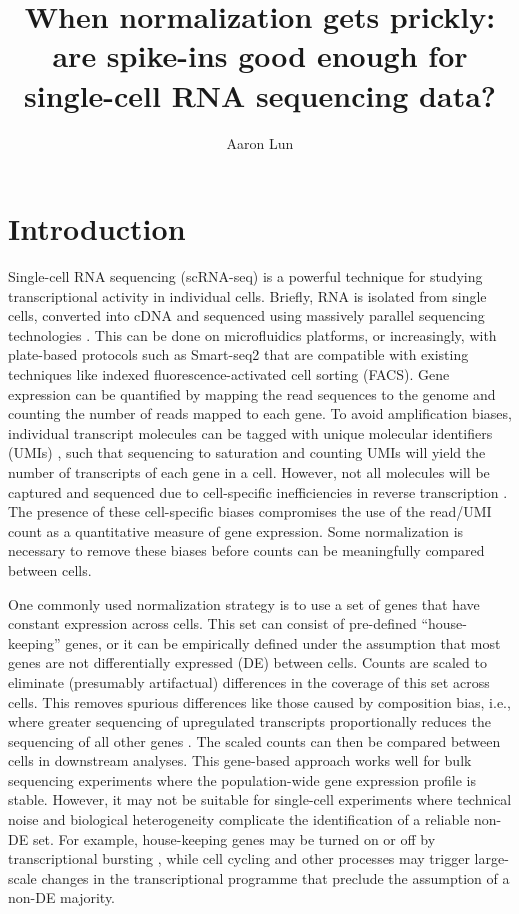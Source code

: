 \documentclass{article}
\title{When normalization gets prickly: are spike-ins good enough for single-cell RNA sequencing data?}
\author{Aaron Lun}
\begin{document}
\maketitle

\section{Introduction}
Single-cell RNA sequencing (scRNA-seq) is a powerful technique for studying transcriptional activity in individual cells.
Briefly, RNA is isolated from single cells, converted into cDNA and sequenced using massively parallel sequencing technologies \cite{shapiro2013singlecell}.
This can be done on microfluidics platforms, or increasingly, with plate-based protocols such as Smart-seq2 \cite{picelli2014full} that are compatible with existing techniques like indexed fluorescence-activated cell sorting (FACS).
Gene expression can be quantified by mapping the read sequences to the genome and counting the number of reads mapped to each gene.
To avoid amplification biases, individual transcript molecules can be tagged with unique molecular identifiers (UMIs) \cite{islam2014quantitative}, such that sequencing to saturation and counting UMIs will yield the number of transcripts of each gene in a cell.
However, not all molecules will be captured and sequenced due to cell-specific inefficiencies in reverse transcription \cite{stegle2015computational}.
The presence of these cell-specific biases compromises the use of the read/UMI count as a quantitative measure of gene expression.
Some normalization is necessary to remove these biases before counts can be meaningfully compared between cells.

One commonly used normalization strategy is to use a set of genes that have constant expression across cells.
This set can consist of pre-defined ``house-keeping'' genes, or it can be empirically defined under the assumption that most genes are not differentially expressed (DE) between cells.
Counts are scaled to eliminate (presumably artifactual) differences in the coverage of this set across cells.
This removes spurious differences like those caused by composition bias, i.e., where greater sequencing of upregulated transcripts proportionally reduces the sequencing of all other genes \cite{robinson2010tmm}.
The scaled counts can then be compared between cells in downstream analyses.
This gene-based approach works well for bulk sequencing experiments where the population-wide gene expression profile is stable.
However, it may not be suitable for single-cell experiments where technical noise and biological heterogeneity complicate the identification of a reliable non-DE set. 
For example, house-keeping genes may be turned on or off by transcriptional bursting \cite{marinov2014singlecell}, while cell cycling and other processes may trigger large-scale changes in the transcriptional programme that preclude the assumption of a non-DE majority.
\end{document}
